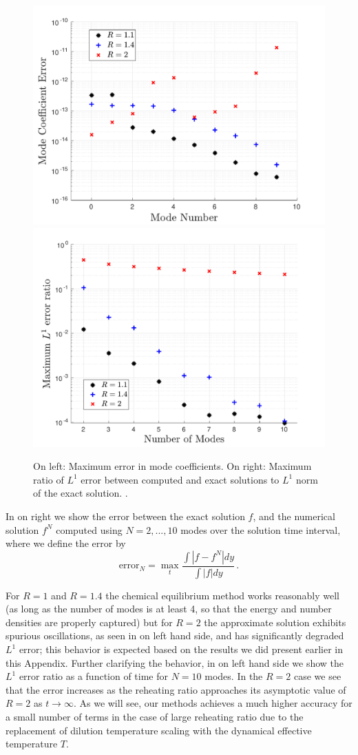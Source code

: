 \begin{figure}
\centerline{\includegraphics[width=0.5\linewidth]{plots/free_stream_b_err.pdf}\hspace*{-0.5cm}
\includegraphics[width=0.5\linewidth]{plots/free_stream_L1_err.pdf}}
\caption{On left: Maximum error in mode coefficients. On right: Maximum ratio  of $L^1$ error between computed and exact solutions to $L^1$ norm of the exact solution. .}\label{fig:freeStreambErr}
\end{figure}

In   on right we show the error between the exact solution $f$, and the numerical solution $f^N$ computed using $N=2,...,10$ modes over the solution time interval, where we define the error by
\begin{equation}\label{fErr}
\text{error}_N=\max_{t} \frac{\int |f-f^N|dy}{\int |f|dy}\,.
\end{equation}

For $R=1$ and $R=1.4$  the chemical equilibrium method works reasonably well (as long as the number of modes is at least 4, so that the energy and number densities are properly captured) but for $R=2$ the approximate solution exhibits spurious oscillations, as seen in  on left hand side, and has significantly degraded $L^1$ error;  this behavior is expected based on the results we did present earlier in this Appendix.
Further clarifying the behavior, in   on left hand side
we show the $L^1$ error ratio as a function of time for $N=10$ modes. In the $R=2$ case we see that the error increases as the reheating ratio approaches its asymptotic value of $R=2$ as $t\rightarrow\infty$.  As we will see, our methods achieves a much higher accuracy for a small number of terms in the case of large reheating ratio due to the replacement of dilution temperature scaling with the dynamical effective temperature $T$.\\ 

